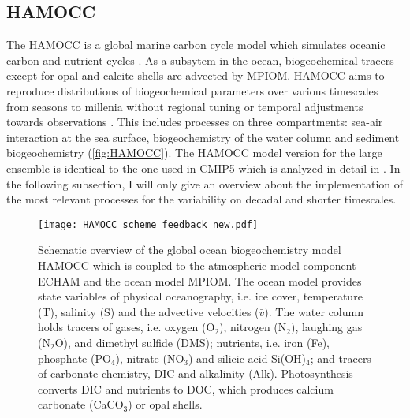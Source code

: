 \subsection{HAMOCC}
\label{sec:HAMOCC}
The \ac{HAMOCC} is a global marine carbon cycle model which simulates oceanic carbon and nutrient cycles \citep{Maier-Reimer1984,Maier-Reimer1993,Six1996}. As a subsytem in the ocean, biogeochemical tracers except for opal and calcite shells are advected by \acs{MPIOM}. \acs{HAMOCC} aims to reproduce distributions of biogeochemical parameters over various timescales from seasons to millenia without regional tuning or temporal adjustments towards observations \citep{Ilyina2013}. This includes processes on three compartments: sea-air interaction at the sea surface, biogeochemistry of the water column and sediment biogeochemistry (\autoref{fig:HAMOCC}). The \acs{HAMOCC} model version for the large ensemble is identical to the one used in \acs{CMIP5} which is analyzed in detail in \cite{Ilyina2013}. In the following subsection, I will only give an overview about the implementation of the most relevant processes for the variability on decadal and shorter timescales.\newline

\begin{figure}[h!]
	\centering
	\texttt{[image: HAMOCC\_scheme\_feedback\_new.pdf]}
	\caption{Schematic overview of the global ocean biogeochemistry model \acs{HAMOCC} \citep{Ilyina2013} which is coupled to the atmospheric model component \acs{ECHAM} and the ocean model \acs{MPIOM}. The ocean model provides state variables of physical oceanography, i.e. ice cover, temperature (T), salinity (S) and the advective velocities ($\bar{v}$).
	 The water column holds tracers of gases, i.e. oxygen (O$_2$), nitrogen (N$_2$), laughing gas (N$_2$O), and dimethyl sulfide (DMS); nutrients, i.e. iron (Fe), phosphate (PO$_4$), nitrate (NO$_3$) and silicic acid Si(OH)$_4$; and tracers of carbonate chemistry, \ie \acf{DIC} and alkalinity (Alk). Photosynthesis converts \ac{DIC} and nutrients to \acf{DOC}, which produces calcium carbonate (CaCO$_3$) or opal shells.}
	\label{fig:HAMOCC}
\end{figure}

